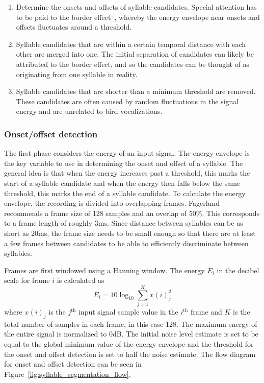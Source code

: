 \begin{enumerate}

  \item Determine the onsets and offsets of syllable candidates. Special
    attention has to be paid to the border effect~\cite{li2001classification},
    whereby the energy envelope near onsets and offsets fluctuates around a
    threshold.

  \item Syllable candidates that are within a certain temporal distance with
    each other are merged into one. The initial separation of candidates can
    likely be attributed to the border effect, and so the candidates can be
    thought of as originating from one syllable in reality.

  \item Syllable candidates that are shorter than a minimum threshold are
    removed. These candidates are often caused by random fluctuations in the
    signal energy and are unrelated to bird vocalizations.

\end{enumerate}

\subsubsection{Onset/offset detection}

The first phase considers the energy of an input signal. The energy envelope is
the key variable to use in determining the onset and offset of a syllable. The
general idea is that when the energy increases past a threshold, this marks the
start of a syllable candidate and when the energy then falls below the same
threshold, this marks the end of a syllable candidate. To calculate the energy
envelope, the recording is divided into overlapping frames.
Fagerlund~\cite{fagerlund2004automatic} recommends a frame size of 128 samples
and an overlap of 50\%. This corresponds to a frame length of roughly 3ms. Since
distance between syllables can be as short as 20ms, the frame size needs to be
small enough so that there are at least a few frames between candidates to be
able to efficiently discriminate between syllables.

Frames are first windowed using a Hanning window. The energy $E_i$ in the
decibel scale for frame $i$ is calculated as
\begin{equation}
  E_i = 10 \log_{10} \sum_{j=1}^{K} x{(i)}_{j}^2
\end{equation}
where $x{(i)}_j$ is the $j^{\text{th}}$ input signal sample value in the
$i^{\text{th}}$ frame and $K$ is the total number of samples in each frame, in
this case 128. The maximum energy of the entire signal is normalized to 0dB. The
initial noise level estimate is set to be equal to the global minimum value of the
energy envelope and the threshold for the onset and offset detection is set to
half the noise estimate. The flow diagram for onset and offset detection can be
seen in Figure~\ref{fig:syllable_segmentation_flow}. 

